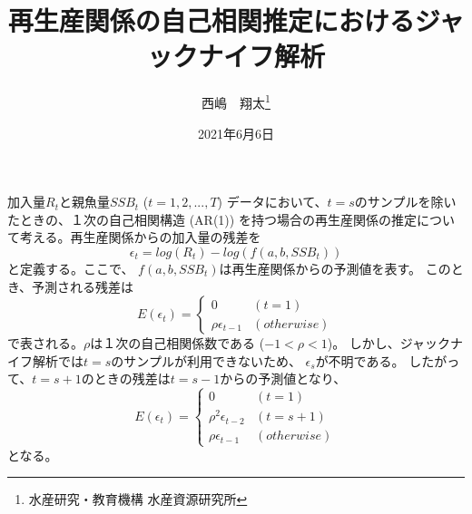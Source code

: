 \documentclass{jsarticle}
\title{再生産関係の自己相関推定におけるジャックナイフ解析}
\author{西嶋　翔太\thanks{水産研究・教育機構 水産資源研究所}}
\date{2021年6月6日}
\begin{document}
 
\maketitle

加入量$R_t$と親魚量$SSB_t$ ($t = 1,2,...,T$) データにおいて、$t = s$のサンプルを除いたときの、１次の自己相関構造 (AR(1)) を持つ場合の再生産関係の推定について考える。再生産関係からの加入量の残差を
$$ \epsilon_t = log(R_t) - log(f(a,b,SSB_t))$$
と定義する。ここで、 $f(a,b,SSB_t)$は再生産関係からの予測値を表す。
このとき、予測される残差は
\begin{equation}
E({\epsilon}_t) = 
\begin{cases}
0 & (t = 1) \\
\rho \epsilon_{t-1} & (otherwise)
\end{cases}
\end{equation}
で表される。$\rho$は１次の自己相関係数である ($-1 < \rho < 1$)。
しかし、ジャックナイフ解析では$t = s$のサンプルが利用できないため、 $\epsilon_{s}$が不明である。
したがって、$t = s + 1$のときの残差は$t = s - 1$からの予測値となり、
\begin{equation}
E({\epsilon}_t) = 
\begin{cases}
0 & (t = 1) \\
\rho^2 \epsilon_{t-2} & (t = s + 1) \\
\rho \epsilon_{t-1} & (otherwise)
\end{cases}
\end{equation}
となる。  
\end{document}
